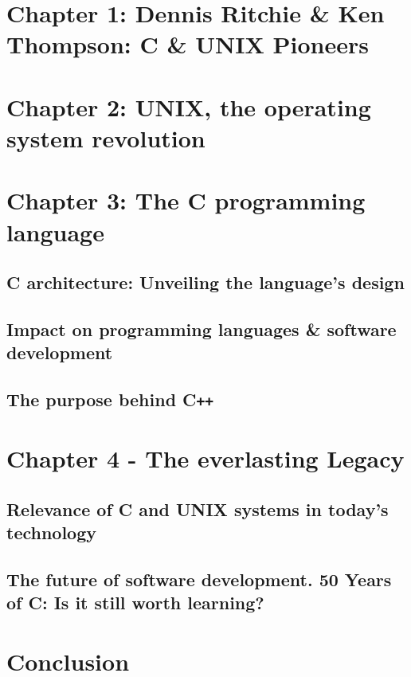 \documentclass[12pt]{article}
\begin{document}
\newpage
\section{Chapter 1: Dennis Ritchie \& Ken Thompson: C \& UNIX Pioneers}

\newpage
\section{Chapter 2: UNIX, the operating system revolution}

\newpage
\section{Chapter 3: The C programming language}
\subsection{C architecture: Unveiling the language's design}

\newpage
\subsection{Impact on programming languages \& software development}

\newpage
\subsection{The purpose behind C\texttt{++}}

\newpage
\section{Chapter 4 - The everlasting Legacy}
\subsection{Relevance of C and UNIX systems in today's technology}

\newpage
\subsection{The future of software development. 50 Years of C: Is it still worth learning?}

\newpage
\section{Conclusion}
\end{document}

